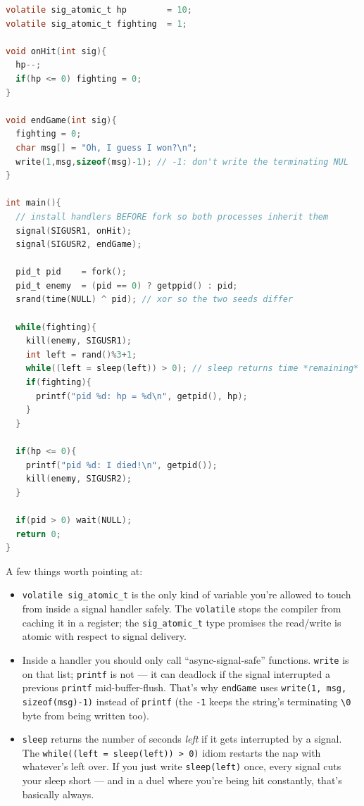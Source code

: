 \documentclass[11pt]{article}
\begin{document}
\begin{lstlisting}[language=C]
volatile sig_atomic_t hp        = 10;
volatile sig_atomic_t fighting  = 1;

void onHit(int sig){
  hp--;
  if(hp <= 0) fighting = 0;
}

void endGame(int sig){
  fighting = 0;
  char msg[] = "Oh, I guess I won?\n";
  write(1,msg,sizeof(msg)-1); // -1: don't write the terminating NUL
}

int main(){
  // install handlers BEFORE fork so both processes inherit them
  signal(SIGUSR1, onHit);
  signal(SIGUSR2, endGame);

  pid_t pid    = fork();
  pid_t enemy  = (pid == 0) ? getppid() : pid;
  srand(time(NULL) ^ pid); // xor so the two seeds differ

  while(fighting){
    kill(enemy, SIGUSR1);
    int left = rand()%3+1;
    while((left = sleep(left)) > 0); // sleep returns time *remaining*
    if(fighting){
      printf("pid %d: hp = %d\n", getpid(), hp);
    }
  }

  if(hp <= 0){
    printf("pid %d: I died!\n", getpid());
    kill(enemy, SIGUSR2);
  }

  if(pid > 0) wait(NULL);
  return 0;
}
\end{lstlisting}

A few things worth pointing at:
\begin{itemize}
  \item \texttt{volatile sig\_atomic\_t} is the only kind of variable
    you're allowed to touch from inside a signal handler safely. The
    \texttt{volatile} stops the compiler from caching it in a
    register; the \texttt{sig\_atomic\_t} type promises the read/write
    is atomic with respect to signal delivery.
  \item Inside a handler you should only call ``async-signal-safe''
    functions. \texttt{write} is on that list; \texttt{printf} is not
    --- it can deadlock if the signal interrupted a previous
    \texttt{printf} mid-buffer-flush. That's why \texttt{endGame}
    uses \texttt{write(1, msg, sizeof(msg)-1)} instead of
    \texttt{printf} (the \texttt{-1} keeps the string's terminating
    \texttt{\textbackslash 0} byte from being written too).
  \item \texttt{sleep} returns the number of seconds \emph{left} if
    it gets interrupted by a signal. The \texttt{while((left =
    sleep(left)) > 0)} idiom restarts the nap with whatever's left
    over. If you just write \texttt{sleep(left)} once, every signal
    cuts your sleep short --- and in a duel where you're being hit
    constantly, that's basically always.
\end{itemize}
\end{document}
